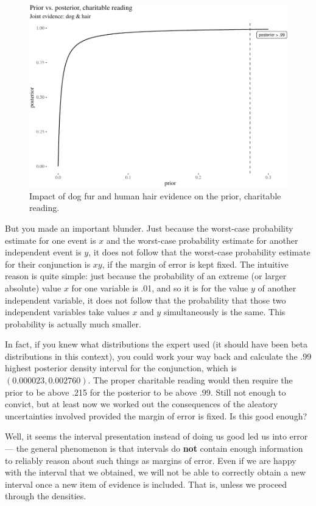 \documentclass[
  10pt,
  dvipsnames,enabledeprecatedfontcommands]{scrartcl}
\begin{document}
\begin{figure}[H]

\begin{center}\includegraphics[width=0.8\linewidth]{chapter-outline_files/figure-latex/fig:charitableImpact7-1} \end{center}
\caption{Impact of dog fur and human hair evidence on the prior, charitable reading.}
\label{fig:impactOfCharitable}
\end{figure}

But you made an important blunder. Just because the worst-case
probability estimate for one event is \(x\) and the worst-case
probability estimate for another independent event is \(y\), it does not
follow that the worst-case probability estimate for their conjunction is
\(xy\), if the margin of error is kept fixed. The intuitive reason is
quite simple: just because the probability of an extreme (or larger
absolute) value \(x\) for one variable is .01, and so it is for the
value \(y\) of another independent variable, it does not follow that the
probability that those two independent variables take values \(x\) and
\(y\) simultaneously is the same. This probability is actually much
smaller.

In fact, if you knew what distributions the expert used (it should have
been beta distributions in this context), you could work your way back
and calculate the .99 highest posterior density interval for the
conjunction, which is \((0.000023, 0.002760)\). The proper charitable
reading would then require the prior to be above .215 for the posterior
to be above .99. Still not enough to convict, but at least now we worked
out the consequences of the aleatory uncertainties involved provided the
margin of error is fixed. Is this good enough?

Well, it seems the interval presentation instead of doing us good led us
into error --- the general phenomenon is that intervals do \textbf{not}
contain enough information to reliably reason about such things as
margins of error. 
Even if we are happy with the interval that we obtained, we will not be
able to correctly obtain a new interval once a new item of evidence is
included. That is, unless we proceed through the densities.
\end{document}
